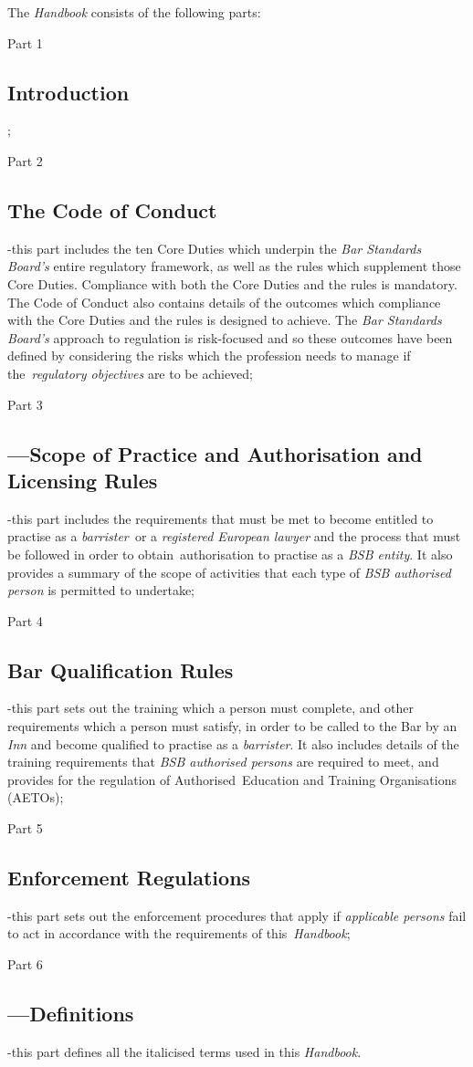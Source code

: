 The \emph{Handbook} consists of the following parts:
\begin{numlist}\item Part 1 \subsection{Introduction};
\item Part 2 \subsection{The Code of Conduct}-this part includes the ten
Core Duties which underpin the \emph{Bar Standards Board's} entire
regulatory framework, as well as the rules which supplement those Core
Duties. Compliance with both the Core Duties and the rules is mandatory.
The Code of Conduct also contains details of the outcomes which
compliance with the Core Duties and the rules is designed to achieve.
The \emph{Bar Standards Board's} approach to regulation is risk-focused
and so these outcomes have been defined by considering the risks which
the profession needs to manage if the~\emph{regulatory objectives} are
to be achieved;
\item Part 3 \subsection{---Scope of Practice and Authorisation and Licensing
Rules}-this part includes the requirements that must be met to become
entitled to practise as a \emph{barrister~}or a \emph{registered
\emph{European lawyer}} and the process that must be followed in order
to obtain~authorisation to practise as a \emph{BSB entity}. It also
provides a summary of the scope of activities that each type of
\emph{BSB authorised person} is permitted to undertake;
\item Part 4 \subsection{Bar Qualification Rules}-this part sets out the
training which a person must complete, and other requirements which a
person must satisfy, in order to be called to the Bar by an \emph{Inn}
and become qualified to practise as a \emph{barrister}. It also includes
details of the training requirements that \emph{BSB authorised persons}
are required to meet, and provides for the regulation of
Authorised~Education and Training Organisations (AETOs);
\item Part 5 \subsection{Enforcement Regulations}-this part sets out the
enforcement procedures that apply if \emph{applicable persons} fail to
act in accordance with the requirements of this~\emph{Handbook};
\item Part 6 \subsection{---Definitions}-this part defines all the
italicised terms used in this \emph{Handbook}.
\end{numlist}

